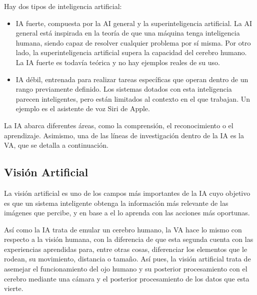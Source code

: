 Hay dos tipos de inteligencia artificial:
\begin{itemize}
 \item{IA fuerte,} compuesta por la AI general y la superinteligencia artificial. La AI general está inspirada en la teoría de que una máquina tenga inteligencia humana, siendo capaz de resolver cualquier problema por sí misma. Por otro lado, la superinteligencia artificial supera la capacidad del cerebro humano. La IA fuerte es todavía teórica y no hay ejemplos reales de su uso.
  \item{IA débil,} entrenada para realizar tareas específicas que operan dentro de un rango previamente definido. Los sistemas dotados con esta inteligencia parecen inteligentes, pero están limitados al contexto en el que trabajan. Un ejemplo es el asistente de voz Siri de Apple.
\end{itemize}

La IA abarca diferentes áreas, como la comprensión, el reconocimiento o el aprendizaje. Asimismo, una de las líneas de investigación dentro de la IA es la VA, que se detalla a continuación.\\

\subsection{Visión Artificial}
\label{sec:subseccion}
La visión artificial es uno de los campos más importantes de la IA cuyo objetivo es que un sistema inteligente obtenga la información más relevante de las imágenes que percibe, y en base a el lo aprenda con las acciones más oportunas.

Así como la IA trata de emular un cerebro humano, la VA hace lo mismo con respecto a la visión humana, con la diferencia de que esta segunda cuenta con las experiencias aprendidas para, entre otras cosas, diferenciar los elementos que le rodean, su movimiento, distancia o tamaño. Así pues, la visión artificial trata de asemejar el funcionamiento del ojo humano y su posterior procesamiento con el cerebro mediante  una cámara y el posterior procesamiento de los datos que esta vierte.\\

